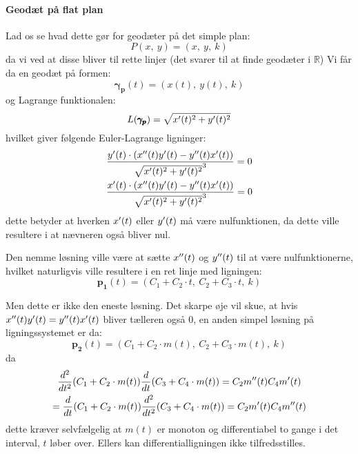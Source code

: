 \paragraph{Geodæt på flat plan}
Lad os se hvad dette gør for geodæter på det simple plan:
\begin{equation*}
P(x,~y) = (x,~y,~k)
\end{equation*}
da vi ved at disse bliver til rette linjer (det svarer til at finde geodæter i \(\mathbb{R}\))
%
Vi får da en geodæt på formen:
\begin{equation*}
\pmb{\gamma_p}(t) = (x(t),~y(t),~k)
\end{equation*}
%
og Lagrange funktionalen:
\begin{equation*}
L(\pmb{\gamma_p}) = \sqrt{ {x}'(t)^2 + {y}'(t)^2 }
\end{equation*}
%
hvilket giver følgende Euler-Lagrange ligninger:
\begin{equation*}
\begin{gathered}
\frac{{y}'(t) \cdot ( {x}''(t){y}'(t) - {y}''(t){x}'(t) )}{\sqrt{{x}'(t)^2 + {y}'(t)^2}^3} = 0\\
\frac{{x}'(t) \cdot ( {x}''(t){y}'(t) - {y}''(t){x}'(t) )}{\sqrt{{x}'(t)^2 + {y}'(t)^2}^3} = 0\\
\end{gathered}
\end{equation*}
%
dette betyder at hverken  \( {x}'(t) \) eller \({y}'(t) \) må være nulfunktionen,
da dette ville resultere i at nævneren også bliver nul.

Den nemme løsning ville være at sætte \({x}''(t)\) og \({y}''(t)\) til at være nulfunktionerne,
hvilket naturligvis ville resultere i en ret linje med ligningen:
\begin{equation*}
\pmb{p_1}(t) = (C_1 + C_2\cdot t,~C_2 + C_3\cdot t,~k)
\end{equation*}

Men dette er ikke den eneste løsning. Det skarpe øje vil skue, at hvis
\( {x}''(t){y}'(t) = {y}''(t){x}'(t) \)
bliver tælleren også \(0\), en anden simpel løsning på ligningssystemet er da:
\begin{equation*}
\pmb{p_2}(t) = (C_1 + C_2\cdot m(t),~C_2 + C_3\cdot m(t),~k)
\end{equation*}
da
\begin{equation*}
\begin{gathered}
\frac{d^2}{dt^2} (C_1 + C_2\cdot m(t)) \frac{d}{dt} (C_3 + C_4\cdot m(t)) = C_2{m}''(t) C_4{m}'(t) \\
 = \frac{d}{dt} (C_1 + C_2\cdot m(t)) \frac{d^2}{dt^2} (C_3 + C_4\cdot m(t)) = C_2{m}'(t) C_4{m}''(t) 
\end{gathered}
\end{equation*}
dette kræver selvfælgelig at \( m(t) \) er monoton og differentiabel to gange i det interval, \(t\) løber over.
Ellers kan differentialligningen ikke tilfredsstilles.

